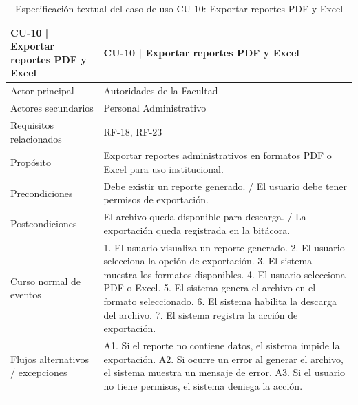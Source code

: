 \begingroup
\small
\begin{longtable}{|P{0.5000}|P{0.5000}|}
\hline
CU-10 | Exportar reportes PDF y Excel & CU-10 | Exportar reportes PDF y Excel \\ \hline
Actor principal & Autoridades de la Facultad \\ \hline
Actores secundarios & Personal Administrativo \\ \hline
Requisitos relacionados & RF-18, RF-23 \\ \hline
Propósito & Exportar reportes administrativos en formatos PDF o Excel para uso institucional. \\ \hline
Precondiciones & Debe existir un reporte generado. / El usuario debe tener permisos de exportación. \\ \hline
Postcondiciones & El archivo queda disponible para descarga. / La exportación queda registrada en la bitácora. \\ \hline
Curso normal de eventos & 1. El usuario visualiza un reporte generado. 2. El usuario selecciona la opción de exportación. 3. El sistema muestra los formatos disponibles. 4. El usuario selecciona PDF o Excel. 5. El sistema genera el archivo en el formato seleccionado. 6. El sistema habilita la descarga del archivo. 7. El sistema registra la acción de exportación. \\ \hline
Flujos alternativos / excepciones & A1. Si el reporte no contiene datos, el sistema impide la exportación. A2. Si ocurre un error al generar el archivo, el sistema muestra un mensaje de error. A3. Si el usuario no tiene permisos, el sistema deniega la acción. \\ \hline
\caption{Especificación textual del caso de uso CU-10: Exportar reportes PDF y Excel}
\end{longtable}
\endgroup

